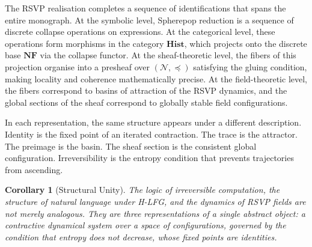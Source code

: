\documentclass[12pt, oneside]{amsbook}
\theoremstyle{plain}
\newtheorem{corollary}[theorem]{Corollary}
\theoremstyle{definition}
\theoremstyle{remark}
\newcommand{\NF}{\mathcal{N}}
\begin{document}
The RSVP realisation completes a sequence of identifications that spans the
entire monograph. At the symbolic level, Spherepop reduction is a sequence
of discrete collapse operations on expressions. At the categorical level,
these operations form morphisms in the category $\mathbf{Hist}$, which
projects onto the discrete base $\mathbf{NF}$ via the collapse functor.
At the sheaf-theoretic level, the fibers of this projection organise into
a presheaf over $(\NF, \preceq)$ satisfying the gluing condition, making
locality and coherence mathematically precise. At the field-theoretic level,
the fibers correspond to basins of attraction of the RSVP dynamics, and
the global sections of the sheaf correspond to globally stable field
configurations.

In each representation, the same structure appears under a different
description. Identity is the fixed point of an iterated contraction. The
trace is the attractor. The preimage is the basin. The sheaf section is the
consistent global configuration. Irreversibility is the entropy condition
that prevents trajectories from ascending.

\begin{corollary}[Structural Unity]
The logic of irreversible computation, the structure of natural language
under H-LFG, and the dynamics of RSVP fields are not merely analogous. They
are three representations of a single abstract object: a contractive dynamical
system over a space of configurations, governed by the condition that
entropy does not decrease, whose fixed points are identities.
\end{corollary}
\end{document}
